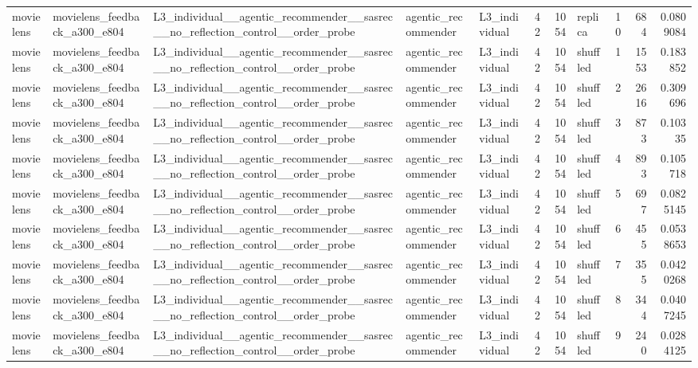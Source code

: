 \begin{table}[htbp!]
\begin{tabular}{lllllrrlrrr}
movielens & movielens\_feedback\_a300\_e804 & L3\_individual\_\_agentic\_recommender\_\_sasrec\_\_no\_reflection\_control\_\_order\_probe & agentic\_recommender & L3\_individual & 42 & 1054 & replica & 10 & 684 & 0.0809084 \\
movielens & movielens\_feedback\_a300\_e804 & L3\_individual\_\_agentic\_recommender\_\_sasrec\_\_no\_reflection\_control\_\_order\_probe & agentic\_recommender & L3\_individual & 42 & 1054 & shuffled & 1 & 1553 & 0.183852 \\
movielens & movielens\_feedback\_a300\_e804 & L3\_individual\_\_agentic\_recommender\_\_sasrec\_\_no\_reflection\_control\_\_order\_probe & agentic\_recommender & L3\_individual & 42 & 1054 & shuffled & 2 & 2616 & 0.309696 \\
movielens & movielens\_feedback\_a300\_e804 & L3\_individual\_\_agentic\_recommender\_\_sasrec\_\_no\_reflection\_control\_\_order\_probe & agentic\_recommender & L3\_individual & 42 & 1054 & shuffled & 3 & 873 & 0.10335 \\
movielens & movielens\_feedback\_a300\_e804 & L3\_individual\_\_agentic\_recommender\_\_sasrec\_\_no\_reflection\_control\_\_order\_probe & agentic\_recommender & L3\_individual & 42 & 1054 & shuffled & 4 & 893 & 0.105718 \\
movielens & movielens\_feedback\_a300\_e804 & L3\_individual\_\_agentic\_recommender\_\_sasrec\_\_no\_reflection\_control\_\_order\_probe & agentic\_recommender & L3\_individual & 42 & 1054 & shuffled & 5 & 697 & 0.0825145 \\
movielens & movielens\_feedback\_a300\_e804 & L3\_individual\_\_agentic\_recommender\_\_sasrec\_\_no\_reflection\_control\_\_order\_probe & agentic\_recommender & L3\_individual & 42 & 1054 & shuffled & 6 & 455 & 0.0538653 \\
movielens & movielens\_feedback\_a300\_e804 & L3\_individual\_\_agentic\_recommender\_\_sasrec\_\_no\_reflection\_control\_\_order\_probe & agentic\_recommender & L3\_individual & 42 & 1054 & shuffled & 7 & 355 & 0.0420268 \\
movielens & movielens\_feedback\_a300\_e804 & L3\_individual\_\_agentic\_recommender\_\_sasrec\_\_no\_reflection\_control\_\_order\_probe & agentic\_recommender & L3\_individual & 42 & 1054 & shuffled & 8 & 344 & 0.0407245 \\
movielens & movielens\_feedback\_a300\_e804 & L3\_individual\_\_agentic\_recommender\_\_sasrec\_\_no\_reflection\_control\_\_order\_probe & agentic\_recommender & L3\_individual & 42 & 1054 & shuffled & 9 & 240 & 0.0284125 \\

\end{tabular}
\end{table}
